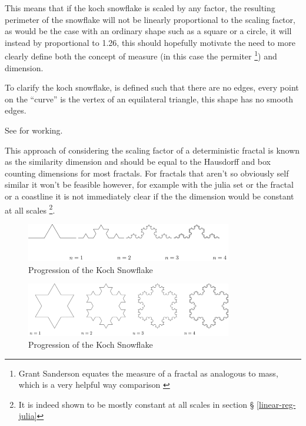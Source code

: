 \documentclass[11pt]{article}
\begin{document}
This means that if the koch snowflake is scaled by any factor, the resulting perimeter of the snowflake will not be linearly proportional to the scaling factor, as would be the case with an ordinary shape such as a square or a circle, it will instead by proportional to 1.26, this should hopefully motivate the need to more clearly define both the concept of measure (in this case the permiter \footnote{Grant Sanderson equates the measure of a fractal as analogous to mass, which is a very helpful way comparison \cite{sandersonFractalsAreTypically2017}}) and dimension.

To clarify the koch snowflake, is defined such that there are no edges, every point on the ``curve'' is the vertex of an equilateral triangle, this shape has no smooth edges.

See \cite[p. 414]{strogatzNonlinearDynamicsChaos2015} for working.

This approach of considering the scaling factor of a deterministic fractal is known as the similarity dimension
\cite[p. 413]{strogatzNonlinearDynamicsChaos2015} and should be equal to the
Hausdorff and box counting dimensions for most fractals. For fractals that aren't so obviously self similar it won't be feasible however, \cite[p. 393]{liIntegrationFuzzyLogic2006}  for example with the julia set or the fractal or a coastline it is not immediately clear if the the dimension would be constant at all scales \footnote{It is indeed shown to be mostly constant at all scales in section \S
\ref{linear-reg-julia}}.



\begin{figure}[htbp]
\centering
\includegraphics[width=9cm]{media/tikz/Koch_line.png}
\caption{\label{koch-line}Progression of the Koch Snowflake}
\end{figure}

\begin{figure}[htbp]
\centering
\includegraphics[width=9cm]{media/tikz/Snowflake.png}
\caption{\label{koch-snowflake}Progression of the Koch Snowflake}
\end{figure}
\end{document}
